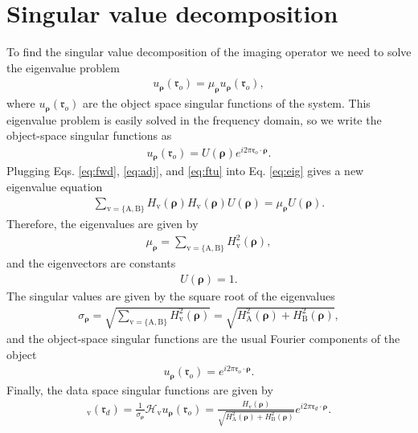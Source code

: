 \documentclass[11pt]{article}
\providecommand{\mc}[1]{\mathcal{#1}}
\providecommand{\ro}[1]{\mathbf{\mathfrak{r}}_o}
\providecommand{\rd}[1]{\mathbf{\mathfrak{r}}_d}
\providecommand{\bs}[1]{\boldsymbol{#1}}
\begin{document}
\section{Singular value decomposition}
To find the singular value decomposition of the imaging operator we need to
solve the eigenvalue problem
\begin{align}
  [\mc{H}^{\dagger}\mc{H}]u_{\bs{\rho}}(\ro{}) = \mu_{\bs{\rho}}u_{\bs{\rho}}(\ro{}), \label{eq:eig}
\end{align}
where $u_{\bs{\rho}}(\ro{})$ are the object space singular functions of the
system. This eigenvalue problem is easily solved in the frequency domain, so we
write the object-space singular functions as
\begin{align}
  u_{\bs{\rho}}(\ro{}) = U(\bs{\rho})e^{i2\pi\ro{}\cdot\bs{\rho}}. \label{eq:ftu}
\end{align}
Plugging Eqs. \ref{eq:fwd}, \ref{eq:adj}, and \ref{eq:ftu} into Eq. \ref{eq:eig}
gives a new eigenvalue equation
\begin{align}
  \sum_{{\text{v}} = \{\text{A}, \text{B}\}}H_{\text{v}}(\bs{\rho})H_{\text{v}}(\bs{\rho})U(\bs{\rho}) = \mu_{\bs{\rho}}U(\bs{\rho}).
\end{align}
Therefore, the eigenvalues are given by
\begin{align}
  \mu_{\bs{\rho}} = \sum_{{\text{v}} = \{\text{A}, \text{B}\}}H^2_{\text{v}}(\bs{\rho}),
\end{align}
and the eigenvectors are constants
\begin{align}
  U(\bs{\rho}) = 1. 
\end{align}
The singular values are given by the square root of the eigenvalues
\begin{align}
  \sigma_{\bs{\rho}} = \sqrt{\sum_{\text{v} = \{\text{A}, \text{B}\}}H^2_\text{v}(\bs{\rho})} = \sqrt{H^2_{\text{A}}(\bs{\rho}) + H^2_{\text{B}}(\bs{\rho})},
\end{align}
and the object-space singular functions are the usual Fourier components of the
object
\begin{align}
  u_{\bs{\rho}}(\ro{}) = e^{i2\pi\ro{}\cdot\bs{\rho}}. 
\end{align}
Finally, the data space singular functions are given by
\begin{align}
  [v_{\bs{\rho}}]_{\text{v}}(\rd{}) = \frac{1}{\sigma_{\bs{\rho}}}\mc{H}_{\text{v}}u_{\bs{\rho}}(\ro{}) = \frac{H_{\text{v}}(\bs{\rho})}{\sqrt{H^2_{\text{A}}(\bs{\rho}) + H^2_{\text{B}}(\bs{\rho})}}e^{i2\pi\rd{}\cdot\bs{\rho}}.
\end{align}
\end{document}

